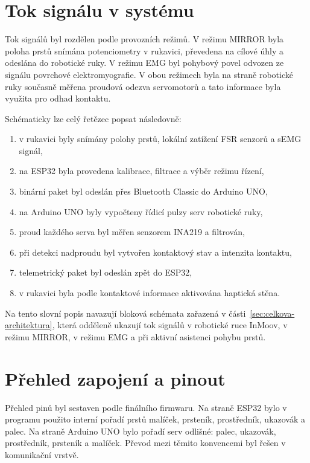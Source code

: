 \section{Tok signálu v systému}
\label{sec:tok-signalu}

Tok signálů byl rozdělen podle provozních režimů. V režimu MIRROR byla poloha prstů snímána potenciometry v rukavici, převedena na cílové úhly a odeslána do robotické ruky. V režimu EMG byl pohybový povel odvozen ze signálu povrchové elektromyografie. V obou režimech byla na straně robotické ruky současně měřena proudová odezva servomotorů a tato informace byla využita pro odhad kontaktu.

Schématicky lze celý řetězec popsat následovně:

\begin{enumerate}
    \item v rukavici byly snímány polohy prstů, lokální zatížení FSR senzorů a sEMG signál,
    \item na ESP32 byla provedena kalibrace, filtrace a výběr režimu řízení,
    \item binární paket byl odeslán přes Bluetooth Classic do Arduino UNO,
    \item na Arduino UNO byly vypočteny řídicí pulzy serv robotické ruky,
    \item proud každého serva byl měřen senzorem INA219 a filtrován,
    \item při detekci nadproudu byl vytvořen kontaktový stav a intenzita kontaktu,
    \item telemetrický paket byl odeslán zpět do ESP32,
    \item v rukavici byla podle kontaktové informace aktivována haptická stěna.
\end{enumerate}

Na tento slovní popis navazují bloková schémata zařazená v části~\ref{sec:celkova-architektura}, která odděleně ukazují tok signálů v robotické ruce InMoov, v režimu MIRROR, v režimu EMG a při aktivní asistenci pohybu prstů.

\section{Přehled zapojení a pinout}
\label{sec:pinout}

Přehled pinů byl sestaven podle finálního firmwaru. Na straně ESP32 bylo v programu použito interní pořadí prstů malíček, prsteník, prostředník, ukazovák a palec. Na straně Arduino UNO bylo pořadí serv odlišné: palec, ukazovák, prostředník, prsteník a malíček. Převod mezi těmito konvencemi byl řešen v komunikační vrstvě.

